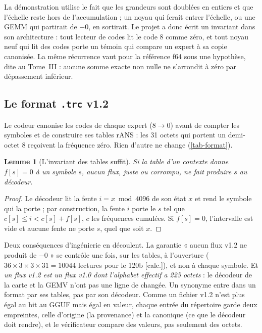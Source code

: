 \documentclass[11pt, a4paper]{article}
\newtheorem{lemma}[proposition]{Lemme}
\theoremstyle{remark}
\newcommand{\etiq}[1]{\textsf{\scriptsize[#1]}}
\newcommand{\calc}{\etiq{calc.}}
\begin{document}
La démonstration utilise le fait que les grandeurs sont doublées en entiers et que l'échelle reste hors de l'accumulation ; un noyau qui ferait entrer l'échelle, ou une GEMM qui partirait de $-0$, en sortirait. Le projet a donc écrit un invariant dans son architecture : tout lecteur de codes lit le code 8 comme zéro, et tout noyau neuf qui lit des codes porte un témoin qui compare un expert à sa copie canonisée. La même récurrence vaut pour la référence f64 sous une hypothèse, dite au Tome~III : aucune somme exacte non nulle ne s'arrondit à zéro par dépassement inférieur.

\subsection{Le format \texttt{.trc} v1.2}\label{sec-format}

Le codeur canonise les codes de chaque expert ($8 \to 0$) avant de compter les symboles et de construire ses tables rANS : les 31 octets qui portent un demi-octet 8 reçoivent la fréquence zéro. Rien d'autre ne change (\cref{tab-format}).

\begin{lemma}[L'invariant des tables suffit]\label{lem-tables}
Si la table d'un contexte donne $f[s] = 0$ à un symbole $s$, aucun flux, juste ou corrompu, ne fait produire $s$ au décodeur.
\end{lemma}
\begin{proof}
Le décodeur lit la fente $i = x \bmod 4096$ de son état $x$ et rend le symbole qui la porte ; par construction, la fente $i$ porte le $s$ tel que $c[s] \le i < c[s] + f[s]$, $c$ les fréquences cumulées. Si $f[s] = 0$, l'intervalle est vide et aucune fente ne porte $s$, quel que soit $x$.
\end{proof}

Deux conséquences d'ingénierie en découlent. La garantie « aucun flux v1.2 ne produit de $-0$ » se contrôle une fois, sur les tables, à l'ouverture ($36 \times 3 \times 3 \times 31 = \num{10044}$ lectures pour le 120b \calc), et non à chaque symbole. Et \emph{un flux v1.2 est un flux v1.0 dont l'alphabet effectif a 225 octets} : le décodeur de la carte et la GEMV n'ont pas une ligne de changée. Un synonyme entre dans un format par ses tables, pas par son décodeur. Comme un fichier v1.2 n'est plus égal au bit au GGUF mais égal en valeur, chaque entrée du répertoire garde deux empreintes, celle d'origine (la provenance) et la canonique (ce que le décodeur doit rendre), et le vérificateur compare des valeurs, pas seulement des octets.
\end{document}
